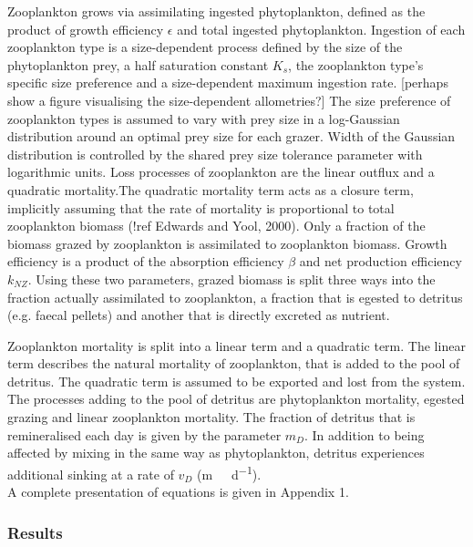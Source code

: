 \documentclass[template.tex]{subfiles}
\begin{document}
Zooplankton grows via assimilating ingested phytoplankton, defined as the product of growth efficiency $\epsilon$ and total ingested phytoplankton. Ingestion of each zooplankton type is a size-dependent process defined by the size of the phytoplankton prey, a half saturation constant $K_s$, the zooplankton type's specific size preference and a size-dependent maximum ingestion rate. [perhaps show a figure visualising the size-dependent allometries?]
The size preference of zooplankton types is assumed to vary with prey size in a log-Gaussian distribution around an optimal prey size for each grazer.
Width of the Gaussian distribution is controlled by the shared prey size tolerance parameter with logarithmic units.
Loss processes of zooplankton are the linear outflux and a quadratic mortality.The quadratic mortality term acts as a closure term, implicitly assuming that the rate of mortality is proportional to total zooplankton biomass (!ref Edwards and Yool, 2000). 
Only a fraction of the biomass grazed by zooplankton is assimilated to zooplankton biomass. Growth efficiency is a product of the absorption efficiency $\beta$ and net production efficiency $k_{NZ}$. Using these two parameters, grazed biomass is split three ways into the fraction actually assimilated to zooplankton, a fraction that is egested to detritus (e.g. faecal pellets) and another that is directly excreted as nutrient. 

Zooplankton mortality is split into a linear term and a quadratic term. The linear term describes the natural mortality of zooplankton, that is added to the pool of detritus. The quadratic term is assumed to be exported and lost from the system.\\

The processes adding to the pool of detritus are phytoplankton mortality, egested grazing and linear zooplankton mortality. The fraction of detritus that is remineralised each day is given by the parameter $m_D$. In addition to being affected by mixing in the same way as phytoplankton, detritus experiences additional sinking at a rate of $v_D$ (\unit{m \ d^{-1}}).\\

A complete presentation of equations is given in Appendix 1.\\

\subsubsection{Results}
\end{document}
